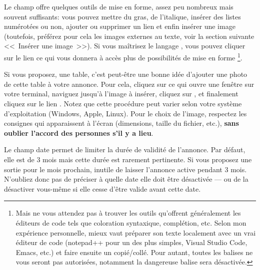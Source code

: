 \medskip
{}
Le champ  offre quelques outils de mise en forme, assez peu nombreux mais souvent suffisants: vous pouvez mettre du gras, de l’italique, insérer des listes numérotées ou non, ajouter ou supprimer un lien et enfin insérer une image (toutefois, préférez pour cela les images externes au texte, voir la section suivante <<~Insérer une image~>>). Si vous maîtrisez le langage , vous pouvez cliquer sur le lien \label{page:editeurTexteBrut} ce qui vous donnera à accès plus de possibilités de mise en forme%
\footnote{Mais ne vous attendez pas à trouver les outils qu'offrent généralement les éditeurs de code tels que coloration syntaxique, complétion, etc. Selon mon expérience personnelle, mieux vaut préparer son texte localement avec un vrai éditeur de code (notepad++ pour un des plus simples, Visual Studio Code, Emacs, etc.) et faire ensuite un copié/collé. Pour autant, toutes les balises ne vous seront pas autorisées, notamment la dangereuse balise  sera désactivée.}.


Si vous proposez, \ex{} une table, c’est peut-être une bonne idée d’ajouter une photo de cette table à votre annonce. Pour cela, cliquez sur  ce qui ouvre une fenêtre sur votre terminal, naviguez jusqu’à l’image à insérer, cliquez sur , et finalement  cliquez sur le lien . Notez que cette procédure peut varier selon votre système d’exploitation (Windows, Apple, Linux). Pour le choix de l’image, respectez les consignes qui apparaissent à l’écran (dimensions, taille du fichier, etc.), \textbf{sans oublier l'accord des personnes s’il y a lieu}.

\label{sec:dureeValiditeAnnonce}

Le champ date  permet de limiter la durée de validité de l’annonce. Par défaut, elle est de 3 mois mais cette durée est rarement pertinente. Si vous proposez une sortie pour le mois prochain, inutile de laisser l'annonce active pendant 3 mois. N’oubliez donc pas de préciser à quelle date elle doit être désactivée --- ou de la désactiver vous-même si elle cesse d'être valide avant cette date.

